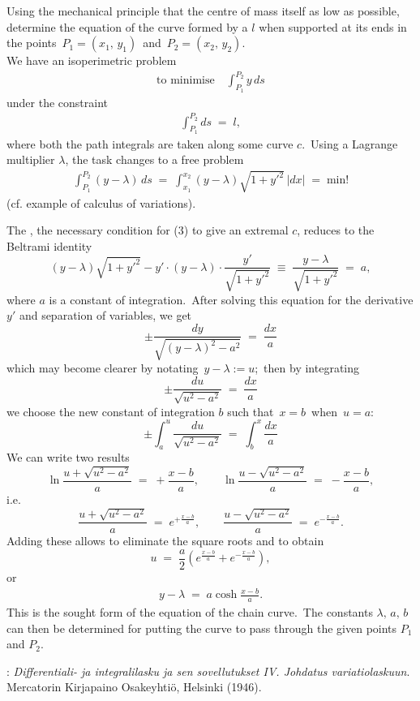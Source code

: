 \documentclass[12pt]{article}
\theoremstyle{definition}
\begin{document}
Using the mechanical principle that the centre of mass  itself as low as possible, determine the equation of the curve formed by a  $l$ when supported at its ends in the points \,$P_1 = (x_1,\,y_1)$\, and\, $P_2 = (x_2,\,y_2)$.\\


We have an isoperimetric problem 
\begin{align}
\mbox{to minimise} \quad \int_{P_1}^{P_2}\!y\,ds
\end{align}
under the constraint
\begin{align}
\int_{P_1}^{P_2}\!ds \;=\; l,
\end{align}
where both the path integrals are taken along some curve $c$.\, Using a Lagrange multiplier $\lambda$, the task changes to a free problem
\begin{align}
\int_{P_1}^{P_2}\!(y\!-\!\lambda)\,ds \;=\; \int_{x_1}^{x_2}(y\!-\!\lambda)\sqrt{1\!+\!y'^2}\,|dx| \;=\; \mbox{min}!
\end{align}
(cf. example of calculus of variations).

The , the necessary condition for (3) to give an extremal $c$, reduces to the Beltrami identity
$$(y\!-\!\lambda)\sqrt{1\!+\!y'^2}-y'\!\cdot\!(y\!-\!\lambda)\!\cdot\!\frac{y'}{\sqrt{1\!+\!y'^2}} 
\;\equiv\; \frac{y\!-\!\lambda}{\sqrt{1\!+\!y'^2}} \;=\; a,$$
where $a$ is a constant of integration.\, After solving this equation for the derivative $y'$ and separation of variables, we get
$$\pm\frac{dy}{\sqrt{(y\!-\!\lambda)^2\!-\!a^2}} \;=\; \frac{dx}{a}$$
which may become clearer by notating\, $y\!-\!\lambda := u$;\, then by integrating
$$\pm\frac{du}{\sqrt{u^2\!-\!a^2}} \;=\; \frac{dx}{a}$$
we choose the new constant of integration $b$ such that\, $x = b$\, when\, $u = a$:
$$\pm\int_a^u\frac{du}{\sqrt{u^2\!-\!a^2}} \;=\; \int_b^x\frac{dx}{a}$$
We can write two  results
$$\ln\frac{u\!+\!\sqrt{u^2\!-\!a^2}}{a} \;=\; +\frac{x\!-\!b}{a}, \qquad 
  \ln\frac{u\!-\!\sqrt{u^2\!-\!a^2}}{a} \;=\; -\frac{x\!-\!b}{a},$$
i.e.
$$\frac{u\!+\!\sqrt{u^2\!-\!a^2}}{a} \;=\; e^{+\frac{x-b}{a}}, \qquad 
  \frac{u\!-\!\sqrt{u^2\!-\!a^2}}{a} \;=\; e^{-\frac{x-b}{a}}.$$
Adding these allows to eliminate the square roots and to obtain
$$u \;=\; \frac{a}{2}\!\left(e^{\frac{x-b}{a}}+e^{-\frac{x-b}{a}}\right),$$
or
\begin{align}
 y\!-\!\lambda \;=\; a\cosh\frac{x\!-\!b}{a}.
\end{align}
This is the sought form of the equation of the chain curve.\, The constants $\lambda,\,a,\,b$ can then be determined for putting the curve to pass through the given points $P_1$ and $P_2$.

\begin{thebibliography}{8}
: {\em Differentiali- ja integralilasku
ja sen sovellutukset IV. Johdatus variatiolaskuun}.\, Mercatorin Kirjapaino Osakeyhti\"o, Helsinki (1946).
\end{thebibliography}
\end{document}

